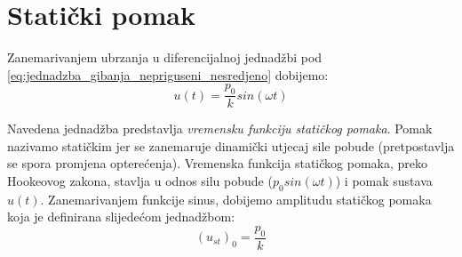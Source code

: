 \section{Statički pomak}
Zanemarivanjem ubrzanja u diferencijalnoj jednadžbi pod
\eqref{eq:jednadzba_gibanja_nepriguseni_nesredjeno} dobijemo:
\begin{equation}\label{eq:vremenska_funkcija_statickog_pomaka}
	u(t)=\frac{p_0}{k}sin(\omega t)
\end{equation}

Navedena jednadžba predstavlja \textit{vremensku funkciju statičkog pomaka}. Pomak
nazivamo statičkim jer se zanemaruje dinamički utjecaj sile pobude (pretpostavlja se
spora promjena opterećenja).
Vremenska funkcija statičkog pomaka, preko Hookeovog zakona, stavlja u odnos silu 
pobude ($p_0sin(\omega t)$) i pomak sustava $u(t)$. Zanemarivanjem funkcije sinus, dobijemo
amplitudu statičkog pomaka koja je definirana slijedećom jednadžbom:
\begin{equation}
	(u_{st})_0 = \frac{p_0}{k}
\end{equation}


